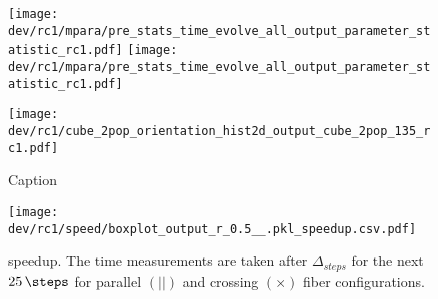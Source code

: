 %
\begin{sidewaysfigure}[!h]
\centering
\texttt{[image: dev/rc1/mpara/pre\_stats\_time\_evolve\_all\_output\_parameter\_statistic\_rc1.pdf]}
\texttt{[image: dev/rc1/mpara/pre\_stats\_time\_evolve\_all\_output\_parameter\_statistic\_rc1.pdf]}
\label{app:pste5}
\end{sidewaysfigure}
%
%
% 
%
\begin{figure}[!h]
    \centering
    \texttt{[image: dev/rc1/cube\_2pop\_orientation\_hist2d\_output\_cube\_2pop\_135\_rc1.pdf]}
    \caption{Caption}
    \label{app:modelHistOrientation}
\end{figure}
%
% 
% 
%
\begin{figure}[!h]
\centering
\texttt{[image: dev/rc1/speed/boxplot\_output\_r\_0.5\_\_.pkl\_speedup.csv.pdf]}
\caption[ speedup]{ speedup. The time measurements are taken after $\Delta_{\mathit{steps}}$ for the next $\SI{25}{\steps}$ for parallel $(||)$ and crossing $(\times)$ fiber configurations.}
\label{app:solverSpeedupAll}
\end{figure}
%
%
%
